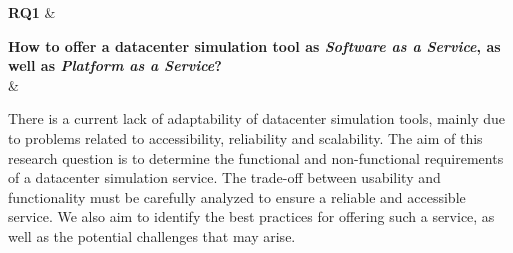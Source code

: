\textbf{RQ1} \label{question:rq1} &

\textbf{How to offer a datacenter simulation tool as \textit{Software as a Service}, as well as \textit{Platform as a Service}?}
\\&

There is a current lack of adaptability of datacenter simulation tools, mainly due to problems related to accessibility, reliability and scalability.
The aim of this research question is to determine the functional and non-functional requirements of a datacenter simulation service.
The trade-off between usability and functionality must be carefully analyzed to ensure a reliable and accessible service.
We also aim to identify the best practices for offering such a service, as well as the potential challenges that may arise.
\\\\